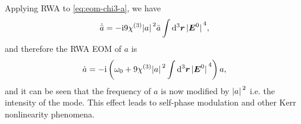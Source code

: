 \documentclass[hyperref, a4paper]{article}
\newcommand*{\ii}{\mathrm{i}}
\begin{document}
Applying RWA to \eqref{eq:eom-chi3-a}, we have 
\begin{equation}
    \dot{\bar{a}} = - \ii 9 \chi^{(3)} \abs*{a}^2 \bar{a} \int \dd[3]{\vb*{r}} \abs*{\vb*{E}^0}^4,
\end{equation}
and therefore the RWA EOM of $a$ is 
\begin{equation}
    \dot{a} = - \ii \left(
        \omega_0 + 9 \chi^{(3)} \abs*{a}^2 \int \dd[3]{\vb*{r}} \abs*{\vb*{E}^0}^4
    \right) a,
\end{equation}
and it can be seen that the frequency of $a$ is now modified by $\abs*{a}^2$ i.e. the intensity of the mode.
This effect leads to self-phase modulation and other Kerr nonlinearity phenomena.
\end{document}
